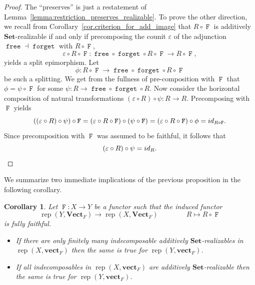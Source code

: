 \documentclass[a4paper]{amsart}
\theoremstyle{plain}
\newtheorem{corollary}[theorem]{Corollary}
\theoremstyle{definition}
\theoremstyle{remark}
\newcommand{\funct}[1]{\operatorname{\mathtt{#1}}}
\DeclareMathOperator{\Hom}{Hom}
\newcommand{\Set}{\mathbf{Set}}
\newcommand{\VectF}{\mathbf{Vect}_F}
\newcommand{\vectF}{\mathbf{vect}_F}
\DeclareMathOperator{\rep}{rep}
\begin{document}
\begin{proof}
The ``preserves'' is just a restatement of Lemma~\ref{lemma:restriction_preserves_realizable}. To prove the other direction, we recall from Corollary~\ref{cor.criterion_for_add_image} that $R\circ \funct{F}$ is additively $\Set$-realizable if and only if precomposing the counit $\varepsilon$ of the adjunction $\funct{free} \dashv \funct{forget}$ with $R\circ \funct{F}$, 
\[ \varepsilon \circ R\circ \funct{F} \colon \funct{free} \circ \funct{forget} \circ R \circ \funct{F} \to R\circ \funct{F},\]
yields a split epimorphism. Let 
\[\phi \colon  R\circ \funct{F} \to  \funct{free}\circ \funct{forget}  \circ R\circ \funct{F}\]
be such a splitting. 
We get from the fullness of pre-composition with $\funct{F}$ that  $\phi = \psi \circ \funct{F}$ for some $\psi \colon R \to  \funct{free}\circ \funct{forget} \circ R$. 
Now consider the horizontal composition of natural transformations
$(\varepsilon \circ R) \circ \psi \colon R \to R$.
Precomposing with $\funct{F}$ yields
%
\[((\varepsilon \circ R) \circ \psi)\circ \funct{F} = (\varepsilon \circ R \circ \funct{F}) \circ (\psi\circ \funct{F}) = (\varepsilon \circ R \circ \funct{F}) \circ \phi = {\rm id}_{R\circ \funct{F}}.\]
Since precomposition with $\funct{F}$ was assumed to be faithful, it follows that 
\[(\varepsilon \circ R) \circ \psi = {\rm id}_{R}. \qedhere \]
\end{proof}

We summarize two immediate implications of the previous proposition in the following corollary. 

\begin{corollary} \label{cor:transfer_to_localization}
Let \( \funct{F} \colon X \to Y \) be a functor such that the induced functor \[ \rep(Y, \VectF) \to \rep(X, \VectF) \qquad\qquad R\mapsto R\circ \funct{F}\] is fully faithful.

\begin{itemize}
\item If there are only finitely many indecomposable additively \( \Set \)-realizables in \( \rep(X, \vectF) \) then the same is true for \( \rep(Y, \vectF) \).
\item If all indecomposables in \( \rep(X, \vectF) \) are additively \( \Set \)-realizable then the same is true for \( \rep(Y, \vectF) \).
\end{itemize}
\end{corollary}
\end{document}
